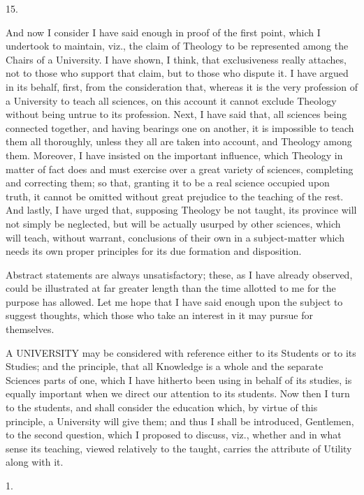 15.

And now I consider I have said enough in proof of the first point,
which I undertook to maintain, viz., the claim of Theology to be
represented among the Chairs of a University. I have shown, I
think, that exclusiveness really attaches, not to those who support
that claim, but to those who dispute it. I have argued in its behalf,
first, from the consideration that, whereas it is the very profession
of a University to teach all sciences, on this account it cannot
exclude Theology without being untrue to its profession. Next, I have
said that, all sciences being connected together, and having bearings
one on another, it is impossible to teach them all thoroughly, unless
they all are taken into account, and Theology among them. Moreover, I
have insisted on the important influence, which Theology in matter of
fact does and must exercise over a great variety of sciences,
completing and correcting them; so that, granting it to be a real
science occupied upon truth, it cannot be omitted without great
prejudice to the teaching of the rest. And lastly, I have urged that,
supposing Theology be not taught, its province will not simply be
neglected, but will be actually usurped by other sciences, which will
teach, without warrant, conclusions of their own in a subject-matter
which needs its own proper principles for its due formation and
disposition.

Abstract statements are always unsatisfactory; these, as I have
already observed, could be illustrated at far greater length than the
time allotted to me for the purpose has allowed. Let me hope that I
have said enough upon the subject to suggest thoughts, which those who
take an interest in it may pursue for themselves.


A UNIVERSITY may be considered with reference either to its
Students or to its Studies; and the principle, that all Knowledge is a
whole and the separate Sciences parts of one, which I have hitherto
been using in behalf of its studies, is equally important when we
direct our attention to its students. Now then I turn to the students,
and shall consider the education which, by virtue of this principle, a
University will give them; and thus I shall be introduced, Gentlemen,
to the second question, which I proposed to discuss, viz., whether and
in what sense its teaching, viewed relatively to the taught, carries
the attribute of Utility along with it.

1.

